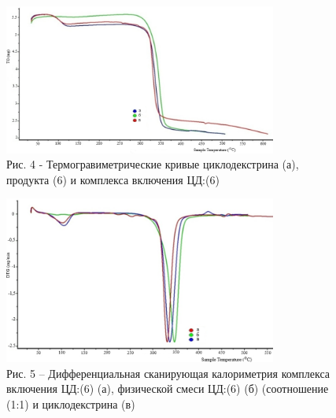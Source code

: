\begin{figure}[H]
	\centering
	\includegraphics[width=0.8\textwidth]{assets/51}
	\caption*{Рис. 4 - Термогравиметрические кривые циклодекстрина (а), продукта (6) и комплекса включения ЦД:(6)}
\end{figure}

\begin{figure}[H]
	\centering
	\includegraphics[width=0.8\textwidth]{assets/52}
	\caption*{Рис. 5 -- Дифференциальная сканирующая калориметрия комплекса включения ЦД:(6) (а), физической смеси ЦД:(6) (б) (соотношение (1:1) и циклодекстрина (в)}
\end{figure}

